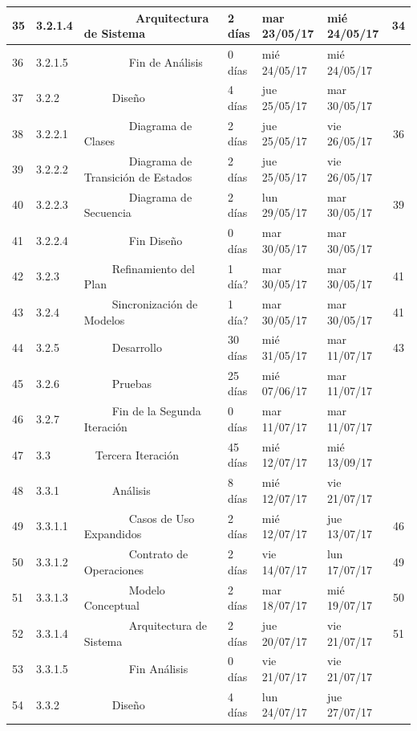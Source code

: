 \begin{center}
\begin{longtable}{  l  l  l  l  l  l  c  }
	35 & 3.2.1.4 &         Arquitectura de Sistema & 2 días & mar 23/05/17 & mié 24/05/17 & 34 \\ \hline
	36 & 3.2.1.5 &         Fin de Análisis & 0 días & mié 24/05/17 & mié 24/05/17 &  \\ \hline
	37 & 3.2.2 &      Diseño & 4 días & jue 25/05/17 & mar 30/05/17 &  \\ \hline
	38 & 3.2.2.1 &         Diagrama de Clases & 2 días & jue 25/05/17 & vie 26/05/17 & 36 \\ \hline
	39 & 3.2.2.2 &         Diagrama de Transición de Estados & 2 días & jue 25/05/17 & vie 26/05/17 &  \\ \hline
	40 & 3.2.2.3 &         Diagrama de Secuencia & 2 días & lun 29/05/17 & mar 30/05/17 & 39 \\ \hline
	41 & 3.2.2.4 &         Fin Diseño & 0 días & mar 30/05/17 & mar 30/05/17 &  \\ \hline
	42 & 3.2.3 &      Refinamiento del Plan & 1 día? & mar 30/05/17 & mar 30/05/17 & 41 \\ \hline
	43 & 3.2.4 &      Sincronización de Modelos & 1 día? & mar 30/05/17 & mar 30/05/17 & 41 \\ \hline
	44 & 3.2.5 &      Desarrollo & 30 días & mié 31/05/17 & mar 11/07/17 & 43 \\ \hline
	45 & 3.2.6 &      Pruebas & 25 días & mié 07/06/17 & mar 11/07/17 &  \\ \hline
	46 & 3.2.7 &      Fin de la Segunda Iteración & 0 días & mar 11/07/17 & mar 11/07/17 &  \\ \hline
	47 & 3.3 &   Tercera Iteración & 45 días & mié 12/07/17 & mié 13/09/17 &  \\ \hline
	48 & 3.3.1 &      Análisis & 8 días & mié 12/07/17 & vie 21/07/17 &  \\ \hline
	49 & 3.3.1.1 &         Casos de Uso Expandidos & 2 días & mié 12/07/17 & jue 13/07/17 & 46 \\ \hline
	50 & 3.3.1.2 &         Contrato de Operaciones & 2 días & vie 14/07/17 & lun 17/07/17 & 49 \\ \hline
	51 & 3.3.1.3 &         Modelo Conceptual & 2 días & mar 18/07/17 & mié 19/07/17 & 50 \\ \hline
	52 & 3.3.1.4 &         Arquitectura de Sistema & 2 días & jue 20/07/17 & vie 21/07/17 & 51 \\ \hline
	53 & 3.3.1.5 &         Fin Análisis & 0 días & vie 21/07/17 & vie 21/07/17 &  \\ \hline
	54 & 3.3.2 &      Diseño & 4 días & lun 24/07/17 & jue 27/07/17 &  \\ \hline

\end{longtable}
\end{center}
